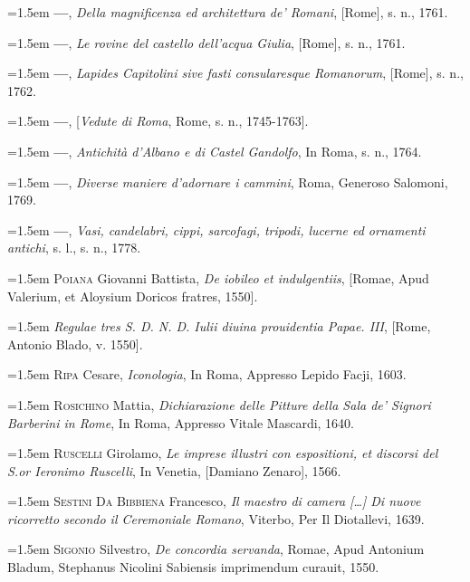 \documentclass[12pt,twoside,openany]{book}
\newenvironment{PurhBibliography}
  {%
    \par
    \setlength{\parindent}{0pt}%
    \setlength{\leftskip}{0pt}%
  }
  {%
    \par
  }
\begin{document}
\begin{PurhBibliography}
\noindent\hangindent=1.5em \textbf{—}, \textit{Della magnificenza ed architettura de’ Romani}, [Rome], s. n., 1761.\par
\noindent\hangindent=1.5em \textbf{—}, \textit{Le rovine del castello dell’acqua Giulia}, [Rome], s. n., 1761.\par
\noindent\hangindent=1.5em \textbf{—}, \textit{Lapides Capitolini sive fasti consularesque Romanorum}, [Rome], s. n., 1762.\par
\noindent\hangindent=1.5em \textbf{—}, [\textit{Vedute di Roma}, Rome, s. n., 1745-1763].\par
\noindent\hangindent=1.5em \textbf{—}, \textit{Antichità d’Albano e di Castel Gandolfo}, In Roma, s. n., 1764.\par
\noindent\hangindent=1.5em \textbf{—}, \textit{Diverse maniere d’adornare i cammini}, Roma, Generoso Salomoni, 1769.\par
\noindent\hangindent=1.5em \textbf{—}, \textit{Vasi, candelabri, cippi, sarcofagi, tripodi, lucerne ed ornamenti antichi}, s. l., s. n., 1778.\par
\noindent\hangindent=1.5em \textsc{Poiana} Giovanni Battista, \textit{De iobileo et indulgentiis}, [Romae, Apud Valerium, et Aloysium Doricos fratres, 1550].\par
\noindent\hangindent=1.5em \textit{Regulae tres S. D. N. D. Iulii diuina prouidentia Papae. III}, [Rome, Antonio Blado, v. 1550].\par
\noindent\hangindent=1.5em \textsc{Ripa} Cesare, \textit{Iconologia}, In Roma, Appresso Lepido Facji, 1603.\par
\noindent\hangindent=1.5em \textsc{Rosichino} Mattia, \textit{Dichiarazione delle Pitture della Sala de’ Signori Barberini in Rome}, In Roma, Appresso Vitale Mascardi, 1640.\par
\noindent\hangindent=1.5em \textsc{Ruscelli} Girolamo, \textit{Le imprese illustri con espositioni, et discorsi del S.or Ieronimo Ruscelli}, In Venetia, [Damiano Zenaro], 1566.\par
\noindent\hangindent=1.5em \textsc{Sestini Da Bibbiena} Francesco,\textit{ Il maestro di camera […] Di nuove ricorretto secondo il Ceremoniale Romano}, Viterbo, Per Il Diotallevi, 1639.\par
\noindent\hangindent=1.5em \textsc{Sigonio} Silvestro, \textit{De concordia servanda}, Romae, Apud Antonium Bladum, Stephanus Nicolini Sabiensis imprimendum curauit, 1550.\par

\end{PurhBibliography}
\end{document}
